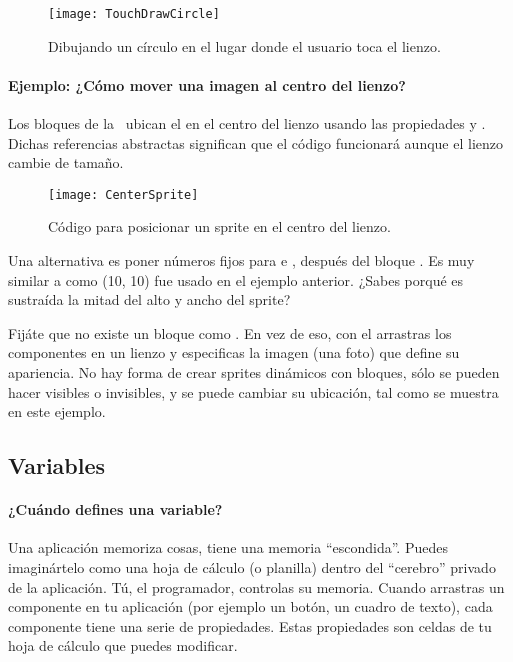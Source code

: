 {{\begin{figure}[H]
\centering
\texttt{[image: TouchDrawCircle]}
\caption{Dibujando un círculo en el lugar donde el usuario toca el lienzo.}
\label{fig:TouchDrawCircle}
\end{figure}

\paragraph{Ejemplo: ¿Cómo mover una imagen al centro del lienzo?}

Los bloques de la~ ubican el
 en el centro del lienzo usando las
propiedades  y . Dichas referencias
abstractas significan que el código funcionará aunque el lienzo cambie
de tamaño.

\begin{figure}[H]
\centering
\texttt{[image: CenterSprite]}
\caption{Código para posicionar un sprite en el centro del lienzo.}
\label{fig:CenterSprite}
\end{figure}

Una alternativa es poner números fijos para  e
, después del bloque . Es muy
similar a como (10, 10) fue usado en el ejemplo anterior. ¿Sabes
porqué es sustraída la mitad del alto y ancho del sprite?

Fijáte que no existe un bloque  como
. En vez de eso, con el \designer arrastras los
componentes  en un lienzo y especificas la
imagen (una foto) que define su apariencia.  No hay forma de crear
sprites dinámicos con bloques, sólo se pueden hacer visibles o
invisibles, y se puede cambiar su ubicación, tal como se muestra en
este ejemplo.

\subsection*{Variables}

\paragraph{¿Cuándo defines una variable?}

Una aplicación memoriza cosas, tiene una memoria ``escondida''. Puedes
imaginártelo como una hoja de cálculo (o planilla) dentro del
``cerebro'' privado de la aplicación. Tú, el programador, controlas su
memoria. Cuando arrastras un componente en tu aplicación (por ejemplo
un botón, un cuadro de texto), cada componente tiene una serie de
propiedades. Estas propiedades son celdas de tu hoja de cálculo que
puedes modificar.

}}
